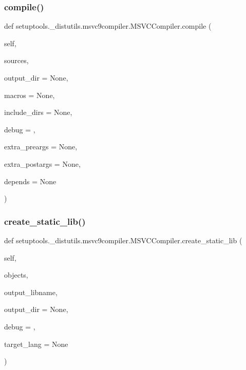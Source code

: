 \subsubsection{\texorpdfstring{compile()}{compile()}}
{\footnotesize\ttfamily def setuptools.\+\_\+distutils.\+msvc9compiler.\+M\+S\+V\+C\+Compiler.\+compile (\begin{DoxyParamCaption}\item[{}]{self,  }\item[{}]{sources,  }\item[{}]{output\+\_\+dir = {\ttfamily None},  }\item[{}]{macros = {\ttfamily None},  }\item[{}]{include\+\_\+dirs = {\ttfamily None},  }\item[{}]{debug = {},  }\item[{}]{extra\+\_\+preargs = {\ttfamily None},  }\item[{}]{extra\+\_\+postargs = {\ttfamily None},  }\item[{}]{depends = {\ttfamily None} }\end{DoxyParamCaption})}

\mbox{\label{classsetuptools_1_1__distutils_1_1msvc9compiler_1_1MSVCCompiler_ac6b97e0c92ce7cc04d96d794e2dfc865}} 
\subsubsection{\texorpdfstring{create\+\_\+static\+\_\+lib()}{create\_static\_lib()}}
{\footnotesize\ttfamily def setuptools.\+\_\+distutils.\+msvc9compiler.\+M\+S\+V\+C\+Compiler.\+create\+\_\+static\+\_\+lib (\begin{DoxyParamCaption}\item[{}]{self,  }\item[{}]{objects,  }\item[{}]{output\+\_\+libname,  }\item[{}]{output\+\_\+dir = {\ttfamily None},  }\item[{}]{debug = {},  }\item[{}]{target\+\_\+lang = {\ttfamily None} }\end{DoxyParamCaption})}

